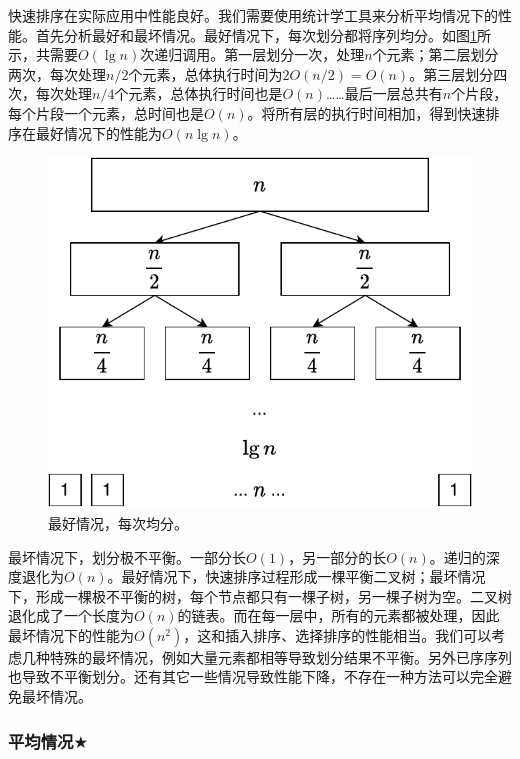 \documentclass[b5paper]{ctexart}
\begin{document}
快速排序在实际应用中性能良好。我们需要使用统计学工具来分析平均情况下的性能。首先分析最好和最坏情况。最好情况下，每次划分都将序列均分。如图\ref{fig:qsort-best}所示，共需要$O(\lg n)$次递归调用。第一层划分一次，处理$n$个元素；第二层划分两次，每次处理$n/2$个元素，总体执行时间为$2 O(n/2) = O(n)$。第三层划分四次，每次处理$n/4$个元素，总体执行时间也是$O(n)$……最后一层总共有$n$个片段，每个片段一个元素，总时间也是$O(n)$。将所有层的执行时间相加，得到快速排序在最好情况下的性能为$O(n \lg n)$。

\begin{figure}[htbp]
 \centering
 \includegraphics[scale=0.55]{img/qsort-best}
 \caption{最好情况，每次均分。}
 \label{fig:qsort-best}
\end{figure}

最坏情况下，划分极不平衡。一部分长$O(1)$，另一部分的长$O(n)$。递归的深度退化为$O(n)$。最好情况下，快速排序过程形成一棵平衡二叉树；最坏情况下，形成一棵极不平衡的树，每个节点都只有一棵子树，另一棵子树为空。二叉树退化成了一个长度为$O(n)$的链表。而在每一层中，所有的元素都被处理，因此最坏情况下的性能为$O(n^2)$，这和插入排序、选择排序的性能相当。我们可以考虑几种特殊的最坏情况，例如大量元素都相等导致划分结果不平衡。另外已序序列也导致不平衡划分。还有其它一些情况导致性能下降，不存在一种方法可以完全避免最坏情况。

\subsubsection{平均情况\texorpdfstring{$\bigstar$}{★}}
\end{document}
